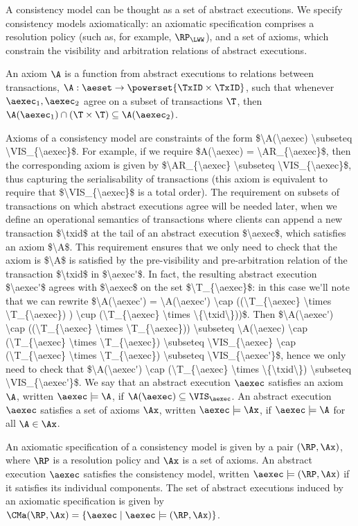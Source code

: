 A consistency model can be thought as a set of abstract executions. 
We specify consistency models axiomatically: an axiomatic specification 
comprises a resolution policy (such as, for example, $\RP_{\LWW}$), 
and a set of axioms, which constrain the visibility and arbitration relations 
of abstract executions. 

\begin{definition}
An axiom $\A$ is a function from abstract executions to relations between 
transactions, $\A: \aeset \rightarrow \powerset{\TxID \times \TxID}$, 
such that whenever $\aexec_1, \aexec_2$ agree on a subset of 
transactions $\T$, then $\A(\aexec_1) \cap (\T \times \T) \subseteq \A(\aexec_2)$.
\end{definition}
\ac{Axioms of a consistency model are constraints of the form $\A(\aexec) \subseteq \VIS_{\aexec}$. 
For example, if we require $A(\aexec) = \AR_{\aexec}$, then the corresponding axiom is given 
by $\AR_{\aexec} \subseteq \VIS_{\aexec}$, thus capturing the serialisability of transactions 
(this axiom is equivalent to require that $\VIS_{\aexec}$ is a total order). The requirement on 
subsets of transactions on which abstract executions agree will be needed later, when 
we define an operational semantics of transactions where clients can append a new transaction $\txid$ 
at the tail of an abstract execution $\aexec$, which satisfies an axiom $\A$. This requirement ensures that 
we only need to check that the axiom is $\A$ is satisfied by the pre-visibility and pre-arbitration relation 
of the transaction $\txid$ in $\aexec'$. In fact, 
the resulting abstract execution $\aexec'$ agrees with $\aexec$ 
on the set $\T_{\aexec}$: in this case we'll note that we can rewrite 
$\A(\aexec') = \A(\aexec') \cap ((\T_{\aexec} \times \T_{\aexec}) ) \cup (\T_{\aexec} \times \{\txid\}))$. Then
 $\A(\aexec') \cap ((\T_{\aexec} \times \T_{\aexec})) \subseteq \A(\aexec) \cap (\T_{\aexec} \times \T_{\aexec}) 
 \subseteq \VIS_{\aexec} \cap (\T_{\aexec} \times \T_{\aexec}) \subseteq \VIS_{\aexec'}$, 
hence we only need to check that $\A(\aexec') \cap (\T_{\aexec} \times \{\txid\}) \subseteq \VIS_{\aexec'}$.}
We say that an abstract execution $\aexec$ satisfies an axiom $\A$, written 
$\aexec \models \A$, if 
$\A(\aexec) \subseteq \VIS_{\aexec}$. An abstract execution $\aexec$ 
satisfies a set of axioms $\Ax$, written $\aexec \models \Ax$,  if $\aexec \models 
\A$ for all $\A \in \Ax$. 

An axiomatic specification of a consistency model is given by a pair $(\RP, \Ax)$, 
where $\RP$ is a resolution policy and $\Ax$ is a set of axioms. An 
abstract execution $\aexec$ satisfies the consistency model, 
written $\aexec \models (\RP, \Ax)$ if it satisfies its individual components. 
The set of abstract executions induced by an axiomatic specification is given 
by $\CMa(\RP, \Ax) = \{ \aexec \mid \aexec \models (\RP, \Ax)\}$.

